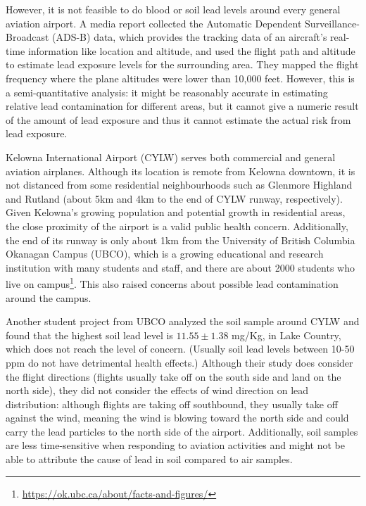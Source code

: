 \documentclass[12pt]{article}
\begin{document}
 However, it is not feasible to do blood or soil lead levels around every general aviation airport. A media report collected the Automatic Dependent Surveillance-Broadcast (ADS-B) data, which provides the tracking data of an aircraft's real-time information like location and altitude, and used the flight path and altitude to estimate lead exposure levels for the surrounding area. They mapped the flight frequency where the plane altitudes were lower than 10,000 feet. \supercite{noauthor_you_2022} However, this is a semi-quantitative analysis: it might be reasonably accurate in estimating relative lead contamination for different areas, but it cannot give a numeric result of the amount of lead exposure and thus it cannot estimate the actual risk from lead exposure. 

Kelowna International Airport (CYLW) serves both commercial and general aviation airplanes. Although its location is remote from Kelowna downtown, it is not distanced from some residential neighbourhoods such as Glenmore Highland and Rutland (about 5km and 4km to the end of CYLW runway, respectively). Given Kelowna's growing population and potential growth in residential areas, the close proximity of the airport is a valid public health concern. Additionally, the end of its runway is only about 1km from the University of British Columbia Okanagan Campus (UBCO), which is a growing educational and research institution with many students and staff, and there are about 2000 students who live on campus\footnote{\url{https://ok.ubc.ca/about/facts-and-figures/}}. This also raised concerns about possible lead contamination around the campus.

Another student project from UBCO analyzed the soil sample around CYLW and found that the highest soil lead level is $11.55\pm 1.38$ mg/Kg, in Lake Country, which does not reach the level of concern. \supercite{harrison_lead_nodate} (Usually soil lead levels between 10-50 ppm do not have detrimental health effects.) \supercite{noauthor_lead_nodate} Although their study does consider the flight directions (flights usually take off on the south side and land on the north side), they did not consider the effects of wind direction on lead distribution: although flights are taking off southbound, they usually take off against the wind, meaning the wind is blowing toward the north side and could carry the lead particles to the north side of the airport. \supercite{harrison_lead_nodate} Additionally, soil samples are less time-sensitive when responding to aviation activities and might not be able to attribute the cause of lead in soil compared to air samples. 
\end{document}

